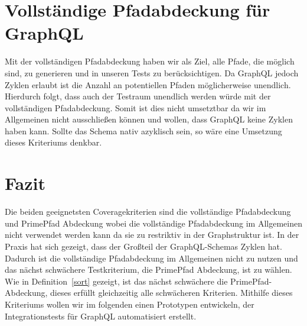 \section{Vollständige Pfadabdeckung für GraphQL}

Mit der vollständigen Pfadabdeckung haben wir als Ziel, alle Pfade, die möglich sind, zu generieren und in unseren Tests zu berücksichtigen.
Da GraphQL jedoch Zyklen erlaubt ist die Anzahl an potentiellen Pfaden möglicherweise unendlich.
Hierdurch folgt, dass auch der Testraum unendlich werden würde mit der vollständigen Pfadabdeckung.
Somit ist dies nicht umsetztbar da wir im Allgemeinen nicht ausschließen können und wollen, dass GraphQL keine Zyklen haben kann.
Sollte das Schema nativ azyklisch sein, so wäre eine Umsetzung dieses Kriteriums denkbar.

\section{Fazit}
\label{fazitcov}

Die beiden geeignetsten Coveragekriterien sind die vollständige Pfadabdeckung und PrimePfad Abdeckung wobei die vollständige Pfadabdeckung im
Allgemeinen nicht verwendet werden kann da sie zu restriktiv in der Graphstruktur ist.
In der Praxis hat sich gezeigt, dass der Großteil der GraphQL-Schemas Zyklen hat.
Dadurch ist die vollständige Pfadabdeckung im Allgemeinen nicht zu nutzen und das nächst schwächere Testkriterium, die PrimePfad Abdeckung, ist zu wählen.
Wie in Definition~\ref{sort} gezeigt, ist das nächst schwächere die PrimePfad-Abdeckung, dieses erfüllt gleichzeitig alle schwächeren Kriterien.
Mithilfe dieses Kriteriums wollen wir im folgenden einen Prototypen entwickeln, der Integrationstests für GraphQL automatisiert erstellt.






